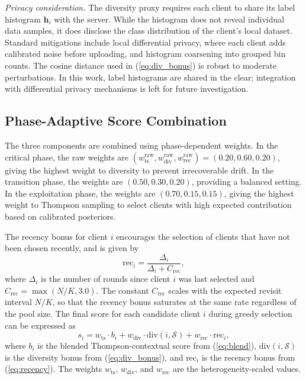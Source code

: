\documentclass[journal]{IEEEtran}
\begin{document}
\textit{Privacy consideration.} The diversity proxy requires each client to share its label histogram $\bm{h}_i$ with the server. While the histogram does not reveal individual data samples, it does disclose the class distribution of the client's local dataset. Standard mitigations include local differential privacy, where each client adds calibrated noise before uploading, and histogram coarsening into grouped bin counts. The cosine distance used in (\ref{eq:div_bonus}) is robust to moderate perturbations. In this work, label histograms are shared in the clear; integration with differential privacy mechanisms is left for future investigation.

\subsection{Phase-Adaptive Score Combination}

The three components are combined using phase-dependent weights. In the critical phase, the raw weights are $(w_{\text{ts}}^{\text{raw}}, w_{\text{div}}^{\text{raw}}, w_{\text{rec}}^{\text{raw}}) = (0.20, 0.60, 0.20)$, giving the highest weight to diversity to prevent irrecoverable drift. In the transition phase, the weights are $(0.50, 0.30, 0.20)$, providing a balanced setting. In the exploitation phase, the weights are $(0.70, 0.15, 0.15)$, giving the highest weight to Thompson sampling to select clients with high expected contribution based on calibrated posteriors.

The recency bonus for client $i$ encourages the selection of clients that have not been chosen recently, and is given by
\begin{equation}
\text{rec}_i = \frac{\Delta_i}{\Delta_i + C_{\text{rec}}},
\label{eq:recency}
\end{equation}
where $\Delta_i$ is the number of rounds since client $i$ was last selected and $C_{\text{rec}} = \max(N/K, 3.0)$. The constant $C_{\text{rec}}$ scales with the expected revisit interval $N/K$, so that the recency bonus saturates at the same rate regardless of the pool size. The final score for each candidate client $i$ during greedy selection can be expressed as
\begin{equation}
s_i = w_{\text{ts}} \cdot b_i + w_{\text{div}} \cdot \text{div}(i, \mathcal{S}) + w_{\text{rec}} \cdot \text{rec}_i,
\label{eq:final_score}
\end{equation}
where $b_i$ is the blended Thompson-contextual score from (\ref{eq:blend}), $\text{div}(i, \mathcal{S})$ is the diversity bonus from (\ref{eq:div_bonus}), and $\text{rec}_i$ is the recency bonus from (\ref{eq:recency}). The weights $w_{\text{ts}}$, $w_{\text{div}}$, and $w_{\text{rec}}$ are the heterogeneity-scaled values.
\end{document}
